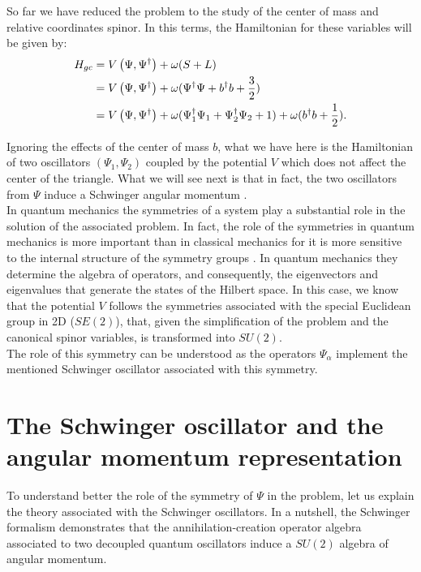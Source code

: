 
So far we have reduced the problem to the study of the center of mass and relative coordinates spinor. In this terms, the Hamiltonian for these variables will be given by:\\

\begin{align*}
H_{gc} &= V\left( \Psi,\Psi^\dagger \right)+ \omega (S+L)\\
&= V\left( \Psi,\Psi^\dagger \right) + \omega(\Psi^\dagger\Psi + b^\dagger b +\frac{3}{2})\\
&= V\left( \Psi,\Psi^\dagger \right) + \omega(\Psi_1^\dagger\Psi_1 +\Psi_2^\dagger\Psi_2+ 1) +\omega(b^\dagger b +\frac{1}{2}).
\end{align*}

Ignoring the effects of the center of mass $b$, what we have here is the Hamiltonian of two oscillators $(\Psi_1,\Psi_2)$ coupled by the potential $V$ which does not affect the center of the triangle. What we will see next is that in fact, the two oscillators from $\Psi$ induce a Schwinger angular momentum \cite{Schwinger}.\\

In quantum mechanics the symmetries of a system play a substantial role in the solution of the associated problem. In fact, the role of the symmetries in quantum mechanics is more important than in classical mechanics for it is more sensitive to the internal structure of the symmetry groups \cite{qfhebook}. In quantum mechanics they determine the algebra of operators, and consequently, the eigenvectors and eigenvalues that generate the states of the Hilbert space. In this case, we know that the potential $V$ follows the symmetries associated with the special Euclidean group in 2D ($SE(2)$), that, given the simplification of the problem and the canonical spinor variables, is transformed into $SU(2)$.\\

The role of this symmetry can be understood as the operators $\Psi_\alpha$ implement the mentioned Schwinger oscillator \cite{Schwinger} associated with this symmetry.\\

\section{The Schwinger oscillator and the angular momentum representation}
To understand better the role of the symmetry of $\Psi$ in the problem, let us explain the theory associated with the Schwinger oscillators. In a nutshell, the Schwinger formalism demonstrates that the annihilation-creation operator algebra associated to two decoupled quantum oscillators induce a $SU(2)$ algebra of angular momentum.\\

